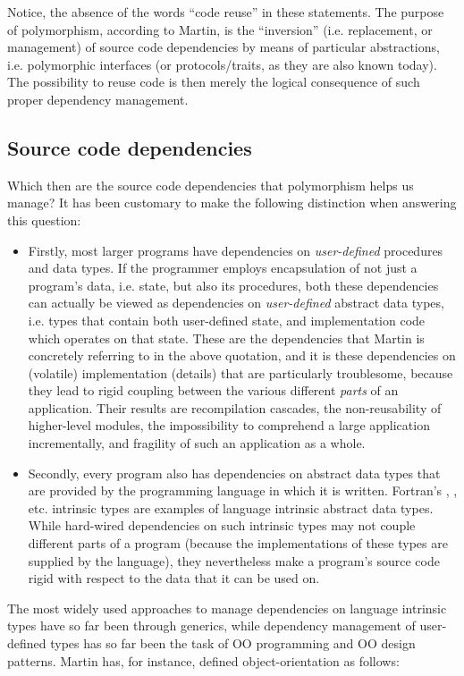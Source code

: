 \documentclass[11pt,oneside]{article}
\newcommand{\code}[1]{{\selectfont\ttfamily{#1}}}
\begin{document}
Notice, the absence of the words ``code reuse'' in these statements.
The purpose of polymorphism, according to Martin, is the ``inversion''
(i.e. replacement, or management) of source code dependencies by means
of particular abstractions, i.e. polymorphic interfaces (or
protocols/traits, as they are also known today). The possibility to
reuse code is then merely the logical consequence of such proper
dependency management.

\subsection{Source code dependencies}

Which then are the source code dependencies that polymorphism helps us
manage? It has been customary to make the following distinction when
answering this question:
\begin{itemize}
\item
 Firstly, most larger programs have dependencies on
 \emph{user-defined} procedures and data types. If the programmer
 employs encapsulation of not just a program's data, i.e. state, but
 also its procedures, both these dependencies can actually be viewed
 as dependencies on \emph{user-defined} abstract data types,
 i.e. types that contain both user-defined state, and implementation
 code which operates on that state. These are the dependencies that
 Martin is concretely referring to in the above quotation, and it is
 these dependencies on (volatile) implementation (details) that are
 particularly troublesome, because they lead to rigid coupling between
 the various different \emph{parts} of an application. Their results
 are recompilation cascades, the non-reusability of higher-level
 modules, the impossibility to comprehend a large application
 incrementally, and fragility of such an application as a whole.
\item
 Secondly, every program also has dependencies on abstract data types
 that are provided by the programming language in which it is written.
 Fortran's \code{integer}, \code{real}, etc. intrinsic types are
 examples of language intrinsic abstract data types. While hard-wired
 dependencies on such intrinsic types may not couple different parts
 of a program (because the implementations of these types are supplied
 by the language), they nevertheless make a program's source code
 rigid with respect to the data that it can be used on.
\end{itemize}

The most widely used approaches to manage dependencies on language
intrinsic types have so far been through generics, while dependency
management of user-defined types has so far been the task of OO
programming and OO design patterns. Martin has, for instance, defined
object-orientation as follows:
\end{document}
